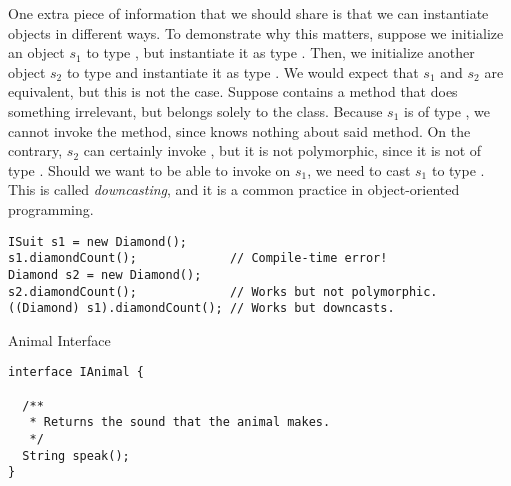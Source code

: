 One extra piece of information that we should share is that we can instantiate objects in different ways. To demonstrate why this matters, suppose we initialize an object $s_1$ to type , but instantiate it as type . Then, we initialize another object $s_2$ to type  and instantiate it as type . We would expect that $s_1$ and $s_2$ are equivalent, but this is not the case. Suppose  contains a method  that does something irrelevant, but belongs solely to the  class. Because $s_1$ is of type , we cannot invoke the  method, since  knows nothing about said method. On the contrary, $s_2$ can certainly invoke , but it is not polymorphic, since it is not of type . Should we want to be able to invoke  on $s_1$, we need to cast $s_1$ to type . This is called \textit{downcasting}, and it is a common practice in object-oriented programming.

\par{
\begin{verbatim}
ISuit s1 = new Diamond();
s1.diamondCount();             // Compile-time error!
Diamond s2 = new Diamond();
s2.diamondCount();             // Works but not polymorphic.
((Diamond) s1).diamondCount(); // Works but downcasts.
\end{verbatim}
}


\begin{cl}[]{Animal Interface}
\begin{lstlisting}[language=MyJava]
interface IAnimal {

  /**
   * Returns the sound that the animal makes.
   */
  String speak();
}
\end{lstlisting}
\end{cl}

